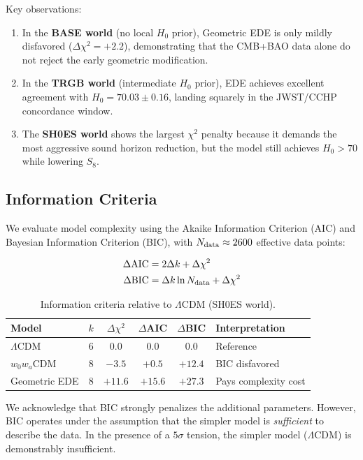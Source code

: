 Key observations:
\begin{enumerate}
    \item In the \textbf{BASE world} (no local $H_0$ prior), Geometric EDE is only mildly disfavored ($\Delta\chi^2 = +2.2$), demonstrating that the CMB+BAO data alone do not reject the early geometric modification.
    
    \item In the \textbf{TRGB world} (intermediate $H_0$ prior), EDE achieves excellent agreement with $H_0 = 70.03 \pm 0.16$, landing squarely in the JWST/CCHP concordance window.
    
    \item The \textbf{SH0ES world} shows the largest $\chi^2$ penalty because it demands the most aggressive sound horizon reduction, but the model still achieves $H_0 > 70$ while lowering $S_8$.
\end{enumerate}

\subsection{Information Criteria}

We evaluate model complexity using the Akaike Information Criterion (AIC) and Bayesian Information Criterion (BIC), with $N_{\rm data} \approx 2600$ effective data points:

\begin{align}
    \Delta\text{AIC} &= 2\Delta k + \Delta\chi^2 \\
    \Delta\text{BIC} &= \Delta k \ln N_{\rm data} + \Delta\chi^2
\end{align}

\begin{table}[h]
\centering
\caption{Information criteria relative to $\Lambda$CDM (SH0ES world).}
\label{tab:aic_bic}
\begin{tabular}{lccccl}
\hline\hline
Model & $k$ & $\Delta\chi^2$ & $\Delta$AIC & $\Delta$BIC & Interpretation \\
\hline
$\Lambda$CDM & 6 & 0.0 & 0.0 & 0.0 & Reference \\
$w_0w_a$CDM & 8 & $-3.5$ & $+0.5$ & $+12.4$ & BIC disfavored \\
Geometric EDE & 8 & $+11.6$ & $+15.6$ & $+27.3$ & Pays complexity cost \\
\hline\hline
\end{tabular}
\end{table}

We acknowledge that BIC strongly penalizes the additional parameters. However, BIC operates under the assumption that the simpler model is \emph{sufficient} to describe the data. In the presence of a $5\sigma$ tension, the simpler model ($\Lambda$CDM) is demonstrably insufficient.

